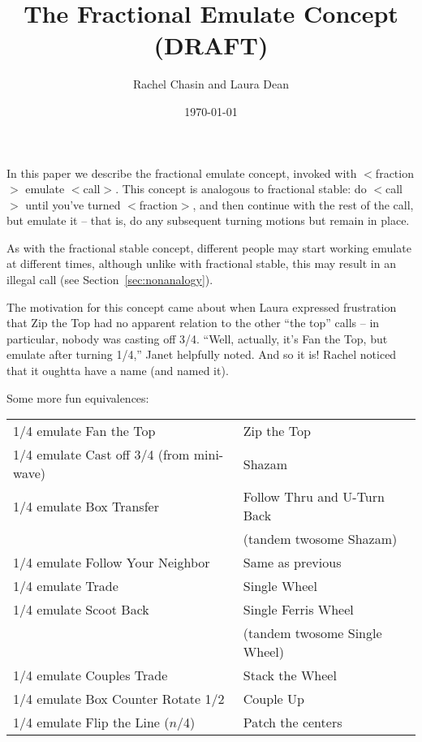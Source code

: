 \documentclass[11pt]{article}
\title{The Fractional Emulate Concept (DRAFT)}
\author{Rachel Chasin and Laura Dean}
\date{\today}
\begin{document}
\thispagestyle{empty}
\maketitle


In this paper we describe the fractional emulate concept, invoked
with $<$fraction$>$ emulate $<$call$>$. This concept
is analogous to fractional stable: do $<$call$>$ until you've
turned $<$fraction$>$, and then continue with the rest of the
call, but emulate it -- that is, do any subsequent turning motions 
but remain in place.

As with the fractional stable concept, different people may start
working emulate at different times, although unlike with fractional
stable, this may result in an illegal call (see
Section~\ref{sec:nonanalogy}).

The motivation for this concept came about when Laura expressed
frustration that Zip the Top had no apparent relation to the other
``the top'' calls -- in particular, nobody was casting off 3/4.
``Well, actually, it's Fan the Top, but emulate after turning 1/4,''
Janet helpfully noted.  And so it is!
Rachel noticed that it oughtta have a name (and named it).

Some more fun equivalences:

\begin{tabular}{|l|l|}
\hline
1/4 emulate Fan the Top   & Zip the Top \\
1/4 emulate Cast off 3/4 (from mini-wave)  & Shazam \\
1/4 emulate Box Transfer & Follow Thru and U-Turn Back \\
& (tandem twosome Shazam) \\
1/4 emulate Follow Your Neighbor  & Same as previous\\
1/4 emulate Trade                          & Single Wheel \\
1/4 emulate Scoot Back  & Single Ferris Wheel \\
& (tandem twosome Single Wheel)\\
1/4 emulate Couples Trade  & Stack the Wheel \\
1/4 emulate Box Counter Rotate 1/2 & Couple Up \\
1/4 emulate Flip the Line ($n$/4) & Patch the centers \\
\hline
\end{tabular}
\end{document}
